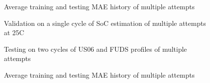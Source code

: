 \begin{figure*}[htbp]
    \centering
    \begin{subfigure}[b]{0.325\textwidth}
        \centering
        
        \caption{Average training and testing MAE history of multiple attempts}
    \end{subfigure}
    \hfill
    \begin{subfigure}[b]{0.325\textwidth}
        \centering
        
        \caption{Validation on a single cycle of SoC estimation of multiple attempts at 25\textdegree{}C}
    \end{subfigure}
    \hfill
    \begin{subfigure}[b]{0.325\textwidth}
        \centering
        
        \caption{Testing on two cycles of US06 and FUDS profiles of multiple attempts}
        \label{subfig:Model-3res-DSTvsFUDS}
    \end{subfigure}
    \begin{subfigure}[b]{0.325\textwidth}
        \centering
        
        \caption{Average training and testing MAE history of multiple attempts}

\end{subfigure}
\end{figure*}
